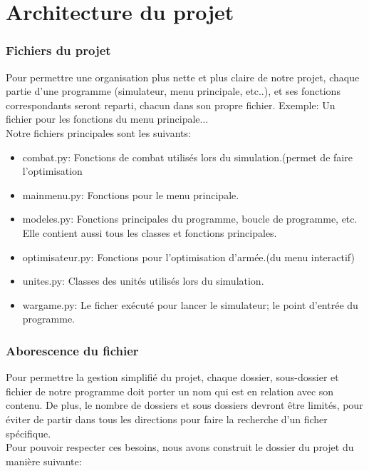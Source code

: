 \documentclass[a4paper, 11pt]{article}
\begin{document}
\newpage

\section{Architecture du projet}

\subsubsection{Fichiers du projet}

Pour permettre une organisation plus nette et plus claire de notre projet, chaque partie d'une programme (simulateur, menu principale, etc..), et ses fonctions correspondants seront reparti, chacun dans son propre fichier. Exemple: Un fichier pour les fonctions du menu principale... \\

Notre fichiers principales sont les suivants:

\begin{itemize}

\item{combat.py: Fonctions de combat utilisés lors du simulation.(permet de faire l’optimisation }
\item{mainmenu.py: Fonctions pour le menu principale.}
\item{modeles.py: Fonctions principales du programme, boucle de programme, etc. Elle contient aussi tous les classes et fonctions principales.}
\item{optimisateur.py: Fonctions pour l'optimisation d'armée.(du menu interactif)}
\item{unites.py: Classes des unités utilisés lors du simulation.}
\item{wargame.py: Le ficher exécuté pour lancer le simulateur; le point d'entrée du programme.}

\end{itemize}

\subsubsection{Aborescence du fichier}

Pour permettre la gestion simplifié du projet, chaque dossier, sous-dossier et fichier de notre programme doit porter un nom qui est en relation avec son contenu. De plus, le nombre de dossiers et sous dossiers devront être limités, pour éviter de partir dans tous les directions pour faire la recherche d'un ficher spécifique. \\
Pour pouvoir respecter ces besoins, nous avons construit le dossier du projet du manière suivante:
\end{document}
